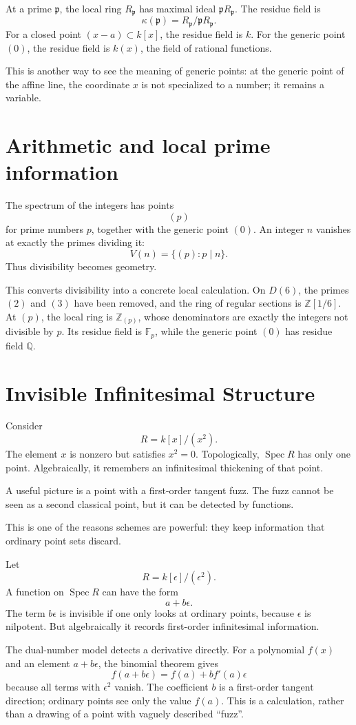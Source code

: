 At a prime \(\mathfrak p\), the local ring \(R_{\mathfrak p}\) has maximal ideal \(\mathfrak pR_{\mathfrak p}\).  The residue field is
\[
  \kappa(\mathfrak p)=R_{\mathfrak p}/\mathfrak pR_{\mathfrak p}.
\]
For a closed point \((x-a)\subset k[x]\), the residue field is \(k\).  For the generic point \((0)\), the residue field is \(k(x)\), the field of rational functions.

This is another way to see the meaning of generic points: at the generic point of the affine line, the coordinate \(x\) is not specialized to a number; it remains a variable.

\section{Arithmetic and local prime information}

The spectrum of the integers has points
\[
  (p)
\]
for prime numbers \(p\), together with the generic point \((0)\). An integer \(n\) vanishes at exactly the primes dividing it:
\[
  V(n)=\{(p):p\mid n\}.
\]
Thus divisibility becomes geometry.

This converts divisibility into a concrete local calculation. On \(D(6)\), the primes \((2)\) and \((3)\) have been removed, and the ring of regular sections is \(\mathbb Z[1/6]\). At \((p)\), the local ring is \(\mathbb Z_{(p)}\), whose denominators are exactly the integers not divisible by \(p\). Its residue field is \(\mathbb F_p\), while the generic point \((0)\) has residue field \(\mathbb Q\).

\section{Invisible Infinitesimal Structure}

Consider
\[
  R=k[x]/(x^2).
\]
The element \(x\) is nonzero but satisfies \(x^2=0\). Topologically, \(\operatorname{Spec}R\) has only one point. Algebraically, it remembers an infinitesimal thickening of that point.

A useful picture is a point with a first-order tangent fuzz. The fuzz cannot be seen as a second classical point, but it can be detected by functions.

This is one of the reasons schemes are powerful: they keep information that ordinary point sets discard.

Let
\[
  R=k[\epsilon]/(\epsilon^2).
\]
A function on \(\operatorname{Spec}R\) can have the form
\[
  a+b\epsilon.
\]
The term \(b\epsilon\) is invisible if one only looks at ordinary points, because \(\epsilon\) is nilpotent.  But algebraically it records first-order infinitesimal information.

The dual-number model detects a derivative directly. For a polynomial \(f(x)\) and an element \(a+b\epsilon\), the binomial theorem gives
\[
 f(a+b\epsilon)=f(a)+bf'(a)\epsilon
\]
because all terms with \(\epsilon^2\) vanish. The coefficient \(b\) is a first-order tangent direction; ordinary points see only the value \(f(a)\). This is a calculation, rather than a drawing of a point with vaguely described ``fuzz''.
